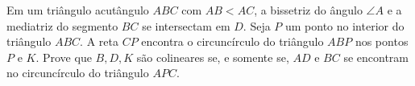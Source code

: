 Em um triângulo acutângulo \(ABC\) com \(AB < AC\), a bissetriz do ângulo \(\angle A\) e a mediatriz do segmento $BC$ se intersectam em $D$.
Seja $P$ um ponto no interior do triângulo \(ABC\).
A reta $CP$ encontra o circuncírculo do triângulo \(ABP\) nos pontos \(P\) e \(K\). Prove que $B, D, K$ são colineares se, e somente se, $AD$ e $BC$ se encontram no circuncírculo do triângulo \(APC\).
